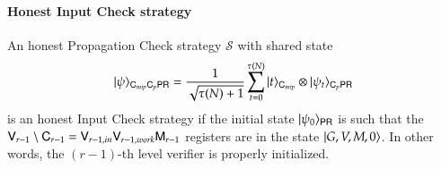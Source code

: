 \paragraph{Honest Input Check strategy}
An honest Propagation Check strategy $\mathcal{S}$ with shared state
\[
	|\psi\rangle_{{\mathsf{C}}_{mip} {\mathsf{C}}_p {\mathsf{P}} {\mathsf{R}}} = \frac{1}{\sqrt{\tau(N) + 1}} \sum_{t = 0}^{\tau(N)} |t\rangle_{{\mathsf{C}}_{mip}} \otimes |\psi_t\rangle_{{\mathsf{C}}_p {\mathsf{P}} {\mathsf{R}}}
\]
is an honest Input Check strategy if the initial state $|\psi_0\rangle_{{\mathsf{P}} {\mathsf{R}}}$ is such that the ${\mathsf{V}}_{r-1} \setminus {\mathsf{C}}_{r-1} = {\mathsf{V}}_{r-1,in}{\mathsf{V}}_{r-1,work} {\mathsf{M}}_{r-1}$ registers are in the state $|G,V,M,0\rangle$. In other words, the $(r-1)$-th level verifier is properly initialized.




